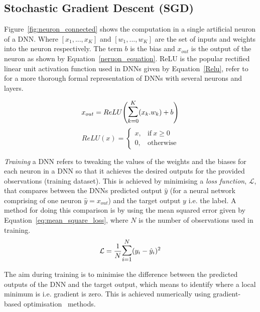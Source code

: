 \subsection{Stochastic Gradient Descent (SGD)}\label{sec:gradient_decent}
Figure~\ref{fig:neuron_connected} shows the computation in a single artificial neuron of a DNN.
%
Where $[x_1, ..., x_K]$ and $[w_1,... ,w_K]$ are the set of inputs and weights into the neuron respectively. The term $b$ is the bias and $x_{out}$ is the output of the neuron as shown by Equation~\ref{neruon_equation}.
ReLU is the popular rectified linear unit activation function used in DNNs given by Equation~\ref{Relu}, refer to ~\cite{Huang2020b} for a more thorough formal representation of DNNs with several neurons and layers. 



\begin{equation} 
 x_{out} = ReLU \Bigg(\mathlarger{\mathlarger{\sum}}_{k=0}^{K} (x_{k}.w_{k})+b \Bigg)
 \label{neruon_equation}
\end{equation}
\begin{equation} 
    ReLU(x) = 
        \begin{cases}
          x, & \text{if}\ x\geq0 \\
          0, & \text{otherwise}
        \end{cases}
\label{Relu}
\end{equation}

%


\textit{Training} a DNN refers to tweaking the values of the weights and the biases for each neuron in a DNN so that it achieves the desired outputs for the provided observations (training dataset). 
%
This is achieved by minimising a \textit{loss function}, $\mathcal{L}$, that compares between the DNNs predicted output $\hat{y}$ (for a neural network comprising of one neuron $\hat{y} = x_{out}$) and the target output $y$ i.e. the label. 
%
A method for doing this comparison is by using the mean squared error given by Equation~\ref{eq:mean_square_loss}, where $N$ is the number of observations used in training.
\begin{equation}
    \mathcal{L} = \frac{1}{N} \mathlarger{\mathlarger{\sum}}_{i=1}^{N} (y_i-\hat{y}_i)^2
    \label{eq:mean_square_loss}
\end{equation}

The aim during training is to minimise the difference between the predicted outputs of the DNN and the target output, which means to identify where a local minimum is i.e. gradient is zero. 
%
This is achieved numerically using gradient-based optimisation~\cite{GoodBengCour2016} methods. 

